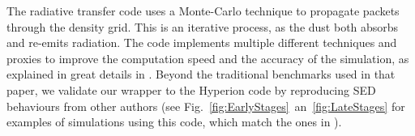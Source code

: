 The radiative transfer code uses a Monte-Carlo technique to propagate packets through the density grid. This is an iterative process, as the dust both absorbs and re-emits radiation. The code implements multiple different techniques and proxies to improve the computation speed and the accuracy of the simulation, as explained in great details in \citet{Robitaille:2011fc}. Beyond the traditional benchmarks used in that paper, we validate our wrapper to the Hyperion code by reproducing SED behaviours from other authors (see Fig.~\ref{fig:EarlyStages}~an~\ref{fig:LateStages} for examples of simulations using this code, which match the ones in \citet{Whitney:2003kc}). 




